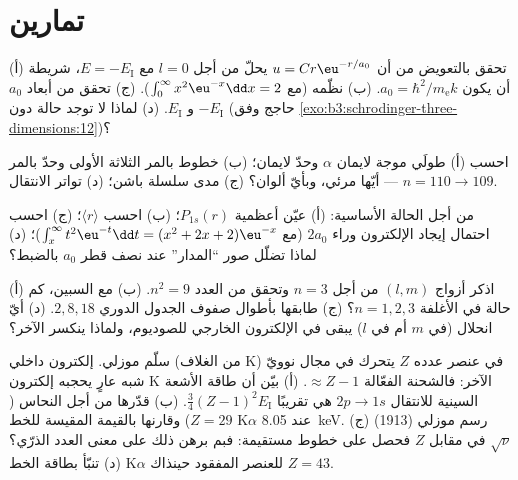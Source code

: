 \section{تمارين}

\begin{exercise}[$\star$]\label{exo:b3:hydrogen-atom:1}
(أ) تحقق بالتعويض من أن $u = Cr\eu^{-r/a_0}$ يحلّ  من أجل $l = 0$ مع $E = -E_{\text{I}}$، شريطة أن يكون $a_0 =
\hbar^2/m_{\text{e}}k$. (ب) نظّمه (مع $\int_0^\infty
x^2\eu^{-x}\dd x = 2$). (ج) تحقق من أبعاد $a_0$ و
$E_{\text{I}}$. (د) لماذا لا توجد حالة دون $-E_{\text{I}}$
(حاجج وفق \cref{exo:b3:schrodinger-three-dimensions:12})؟
\end{exercise}

\begin{exercise}[$\star$]\label{exo:b3:hydrogen-atom:2}
احسب (أ) طولَي موجة لايمان $\alpha$ وحدّ لايمان؛ (ب) خطوط
بالمر الثلاثة الأولى وحدّ بالمر ---
أيّها مرئي، وبأيّ ألوان؟ (ج) مدى سلسلة باشن؛
(د) تواتر الانتقال $n = 110 \to 109$.
\end{exercise}

\begin{exercise}[$\star$]\label{exo:b3:hydrogen-atom:3}
من أجل الحالة الأساسية: (أ) عيّن أعظمية $P_{1s}(r)$؛ (ب)
احسب $\langle r\rangle$؛ (ج) احسب احتمال إيجاد
الإلكترون وراء $2a_0$ (مع $\int_x^\infty t^2\eu^{-t}\dd t = (x^2 +
2x + 2)\eu^{-x}$)؛ (د) لماذا تضلّل صور ``المدار'' عند نصف قطر
$a_0$ بالضبط؟
\end{exercise}

\begin{exercise}[$\star$]\label{exo:b3:hydrogen-atom:4}
(أ) اذكر أزواج $(l, m)$ من أجل $n = 3$ وتحقق من العدد $n^2 =
9$. (ب) مع السبين، كم حالة في الأغلفة $n = 1, 2, 3$؟ (ج)
طابقها بأطوال صفوف الجدول الدوري $2, 8, 18$. (د)
أيّ انحلال (في $m$ أم في $l$) يبقى في الإلكترون الخارجي
للصوديوم، ولماذا ينكسر الآخر؟
\end{exercise}

\begin{exercise}[$\star\star$]\label{exo:b3:hydrogen-atom:5}
سلّم موزلي. إلكترون داخلي (من الغلاف K) في عنصر عدده $Z$
يتحرك في مجال نوويّ شبه عارٍ يحجبه إلكترون K
الآخر: فالشحنة الفعّالة $\approx Z - 1$. (أ) بيّن أن طاقة الأشعة السينية
للانتقال $2p \to 1s$ هي تقريبًا $\tfrac34(Z-1)^2E_{\text{I}}$. (ب)
قدّرها من أجل النحاس ($Z = 29$) وقارنها بالقيمة المقيسة للخط
K$\alpha$ عند \qty{8.05}{keV}. (ج) رسم موزلي (1913)
$\sqrt{\nu}$ في مقابل $Z$ فحصل على خطوط مستقيمة: فبم برهن ذلك
على معنى العدد الذرّي؟ (د) تنبّأ بطاقة الخط K$\alpha$
للعنصر المفقود حينذاك $Z = 43$.
\end{exercise}

